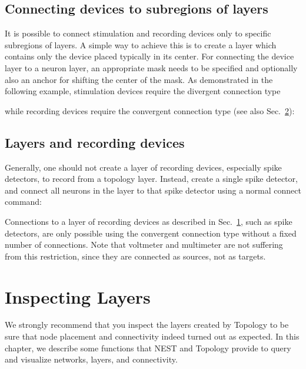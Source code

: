 \documentclass[a4paper,12pt]{report}
\begin{document}
\section{Connecting devices to subregions of layers}\label{sec:dev_subregions}

It is possible to connect stimulation and recording devices only to specific
subregions of layers. A simple way to achieve this is to create a layer
which contains only the device placed typically in its center.
For connecting the device layer to a neuron layer, an appropriate mask
needs to be specified and optionally also an anchor for shifting the
center of the mask.
As demonstrated in the following example, stimulation devices require the
divergent connection type

while recording devices require the convergent connection type (see also
Sec.~\ref{sec:rec_dev}):


\section{Layers and recording devices}\label{sec:rec_dev}

Generally, one should not create a layer of recording devices, especially
spike detectors, to record from a topology layer. Instead, create a single
spike detector, and connect all neurons in the layer to that spike detector
using a normal connect command:


Connections to a layer of recording devices as described in
Sec.~\ref{sec:dev_subregions}, such as spike detectors, are
only possible using the convergent connection type without a fixed number
of connections. Note that voltmeter and multimeter are not suffering from
this restriction, since they are connected as sources, not as targets.

\chapter{Inspecting Layers}\label{sec:inspection}

We strongly recommend that you inspect the layers created by Topology
to be sure that node placement and connectivity indeed turned out as
expected. In this chapter, we describe some functions that NEST and
Topology provide to query and visualize networks, layers, and
connectivity.
\end{document}
